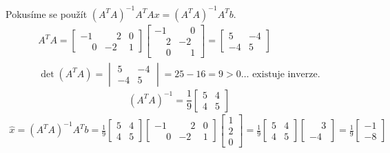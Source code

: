 Pokusíme se použít $(A^T A)^{-1} A^T A x = (A^T A)^{-1} A^T b$.
\begin{align*}
    A^T A = 
    \begin{bmatrix}
        -1 & \phantom{-}2 & 0 \\
        \phantom{-}0 & -2 & 1    
    \end{bmatrix}
    \begin{bmatrix}
        -1 & \phantom{-}0 \\
        \phantom{-}2 & -2 \\
        \phantom{-}0 & \phantom{-}1   
    \end{bmatrix} = 
    \begin{bmatrix}
        5 & -4 \\
        -4 & 5    
    \end{bmatrix} \\
    \det(A^T A) = 
    \begin{vmatrix}
        5 & -4 \\
        -4 & 5  
    \end{vmatrix} = 25 - 16 = 9 > 0 \dots \text{ existuje inverze.}
\end{align*}
\[
    (A^T A)^{-1} = \frac{1}{9}
    \begin{bmatrix}
        5 & 4 \\
        4 & 5    
    \end{bmatrix}
\]
\begin{align*}
    \hat x = (A^T A)^{-1} A^T b = \frac{1}{9}
    \begin{bmatrix}
        5 & 4 \\
        4 & 5    
    \end{bmatrix}
    \begin{bmatrix}
        -1 & \phantom{-}2 & 0 \\
        \phantom{-}0 & -2 & 1    
    \end{bmatrix}
    \begin{bmatrix}
        1 \\ 2  \\ 0
    \end{bmatrix} = \frac{1}{9}
    \begin{bmatrix}
        5 & 4 \\
        4 & 5    
    \end{bmatrix}
    \begin{bmatrix}
        \phantom{-}3 \\ -4 
    \end{bmatrix} = \frac{1}{9}
    \begin{bmatrix}
        -1 \\ -8
    \end{bmatrix}
\end{align*}

